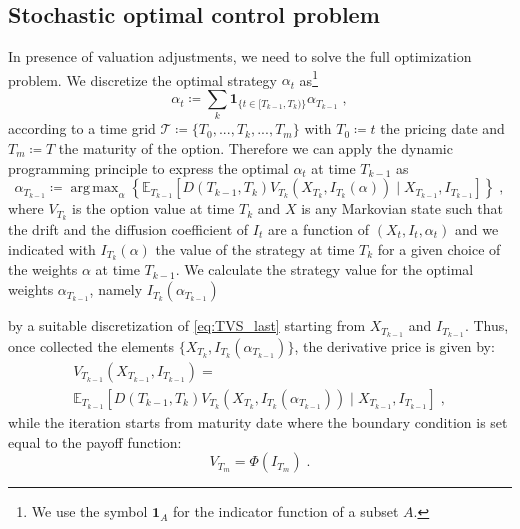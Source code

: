 \documentclass[runningheads]{m2ef}
\DeclareMathOperator*{\argmax}{arg\,max}
\newcommand\soutpars[1]{\let\helpcmd\sout\parhelp#1\par\relax\relax}
\newcommand{\remove}[1]{{\color{red} \soutpars{{#1}}}}%
\begin{document}
	\subsection{Stochastic optimal control problem}
	In presence of valuation adjustments, we need to solve the full optimization problem. We discretize the optimal strategy $\alpha_t$ as\footnote{We use the symbol $\mathbf{1}_A$ for the indicator function of a subset $A$.}
	\begin{equation}
		\alpha_t \coloneqq \sum_k \mathbf{1}_{ \{t \in [T_{k-1}, T_k)\}}\alpha_{T_{k-1}} \; ,
	\label{eq:piecewise_strategy}\end{equation}
	according to a time grid $\mathcal{T}\coloneqq \{T_0,...,T_k,...,T_m\}$ with $T_0\coloneqq t$ the pricing date and $T_m \coloneqq T$ the maturity of the option. 
	Therefore we can apply the dynamic programming principle to express the optimal $\alpha_t$ at time $T_{k-1}$ as
	\begin{equation}
		\alpha_{T_{k-1}}\coloneqq \argmax_{\alpha} \left\{\mathbb{E}_{T_{k-1}}\left[D\left(T_{k-1},T_{k} \right) V_{T_{k}}\left(X_{T_{k}}, I_{T_{k}}(\alpha)\right) \mid X_{T_{k-1}}, I_{T_{k-1}}\right]\right\} \; ,
	\label{eq:recursion}\end{equation}
	where $V_{T_k}$ is the option value at time $T_k$ and $X$ is any Markovian state such that the drift and the diffusion coefficient of $I_t$ are a function of $\left(X_t,I_t,\alpha_t\right)$ and we indicated with $I_{T_k}\left(\alpha\right)$ the value of the strategy at time $T_{k}$ for a given choice of the weights $\alpha$ at time $T_{k-1}$. We calculate the strategy value for the optimal weights $\alpha_{T_{k-1}}$, namely $I_{T_k}\left(\alpha_{T_{k-1}}\right)$ \remove{for any given strategy $\alpha_{T_{k-1}}$} by a suitable discretization of \eqref{eq:TVS_last} starting from $X_{T_{k-1}}$ and $I_{T_{k-1}}$.
	Thus, once collected the elements $\{X_{T_{k}}, I_{T_{k}}\left(\alpha_{T_{k-1}}\right)\}$, the derivative price is given by:
	\begin{equation}
	\begin{aligned}
			V_{T_{k-1}}\left(X_{T_{k-1}}, I_{T_{k-1}}\right)= \\ 
			\mathbb{E}_{T_{k-1}}\left[D\left(T_{k-1},T_{k}\right) V_{T_{k}}\left(X_{T_{k}}, I_{T_{k}}\left(\alpha_{T_{k-1}}\right)\right) \mid X_{T_{k-1}}, I_{T_{k-1}}\right] \; ,
	\end{aligned}
	\label{eq:recursion2}\end{equation}
	while the iteration starts from maturity date where the boundary condition is set equal to the payoff function:
	\begin{equation}
		V_{T_m} = \Phi\left(I_{T_m}\right) \; .
	\end{equation}
\end{document}
